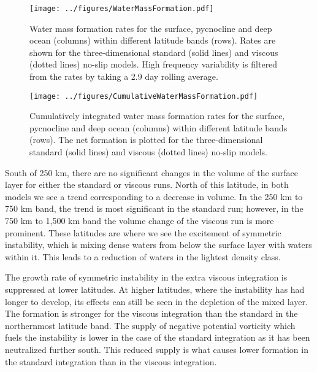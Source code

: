 \begin{figure} 
    \centering
    \texttt{[image: ../figures/WaterMassFormation.pdf]}
    \caption{Water mass formation rates for the surface, pycnocline and deep ocean (columns) within different latitude bands (rows). Rates are shown for the three-dimensional standard (solid lines) and viscous (dotted lines) no-slip models. High frequency variability is filtered from the rates by taking a 2.9 day rolling average.}
    \label{fig:WaterMassFormation}
\end{figure}

\begin{figure} 
    \centering
    \texttt{[image: ../figures/CumulativeWaterMassFormation.pdf]}
    \caption{Cumulatively integrated water mass formation rates for the surface, pycnocline and deep ocean (columns) within different latitude bands (rows). The net formation is plotted for the three-dimensional standard (solid lines) and viscous (dotted lines) no-slip models.}
    \label{fig:CumulativeWaterMassFormation}
\end{figure}

South of 250 km, there are no significant changes in the volume of the surface layer for either the standard or viscous runs. North of this latitude, in both models we see a trend corresponding to a decrease in volume. In the 250 km to 750 km band, the trend is most significant in the standard run; however, in the 750 km to 1,500 km band the volume change of the viscous run is more prominent. These latitudes are where we see the excitement of symmetric instability, which is mixing dense waters from below the surface layer with waters within it. This leads to a reduction of waters in the lightest density class.

The growth rate of symmetric instability in the extra viscous integration is suppressed at lower latitudes. At higher latitudes, where the instability has had longer to develop, its effects can still be seen in the depletion of the mixed layer. The formation is stronger for the viscous integration than the standard in the northernmost latitude band. The supply of negative potential vorticity which fuels the instability is lower in the case of the standard integration as it has been neutralized further south. This reduced supply is what causes lower formation in the standard integration than in the viscous integration.

